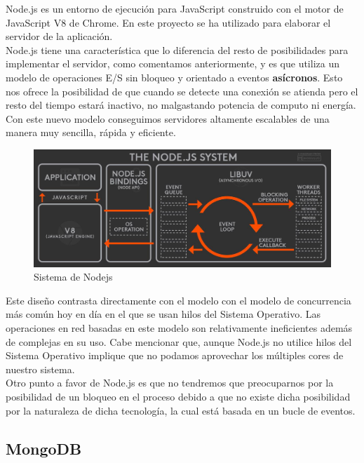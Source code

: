Node.js es un entorno de ejecución para JavaScript construido con el motor de JavaScript
V8 de Chrome. En este proyecto se ha utilizado para elaborar el servidor de la aplicación.\\

Node.js tiene una característica que lo diferencia del resto de posibilidades para implementar 
el servidor, como comentamos anteriormente, y es que utiliza un modelo de operaciones E/S sin bloqueo y orientado a eventos 
\textbf{asícronos}. Esto nos ofrece la posibilidad de que cuando se detecte una conexión se atienda
pero el resto del tiempo estará inactivo, no malgastando potencia de computo ni energía. Con este nuevo modelo conseguimos servidores altamente 
escalables de una manera muy sencilla, rápida y eficiente.\\

\begin{figure}[H]
	\centering
	\includegraphics[scale=0.25]{imagenes/nodejs_system.jpg}
	\caption{Sistema de Nodejs \label{fig:figura1}}
\end{figure}

Este diseño contrasta directamente con el modelo con el modelo de concurrencia más común hoy en 
día en el que se usan hilos del Sistema Operativo. Las operaciones en red basadas en este modelo
son relativamente ineficientes además de complejas en su uso. Cabe mencionar que, aunque Node.js 
no utilice hilos del Sistema Operativo implique que no podamos aprovechar los múltiples cores
de nuestro sistema.\\

Otro punto a favor de Node.js es que no tendremos que preocuparnos por la posibilidad de un 
bloqueo en el proceso debido a que no existe dicha posibilidad por la naturaleza de dicha 
tecnología, la cual está basada en un bucle de eventos.

\subsection{MongoDB}

